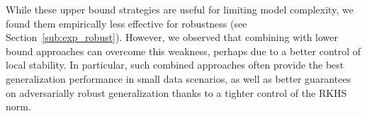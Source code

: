 While these upper bound strategies are useful for limiting model complexity,
we found them empirically less effective for robustness (see Section~\ref{sub:exp_robust}).
However, we observed that combining with lower bound approaches can overcome this weakness,
perhaps due to a better control of local stability.
In particular, such combined approaches often provide the best generalization performance
in small data scenarios, as well as better guarantees on adversarially robust generalization
thanks to a tighter control of the RKHS norm.

